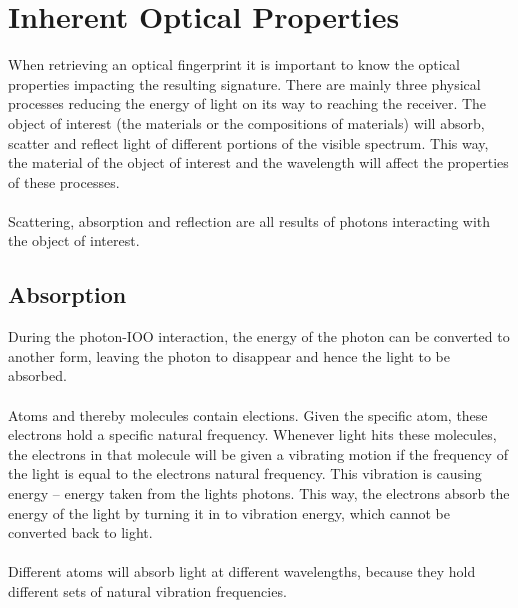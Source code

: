 \section{Inherent Optical Properties}
When retrieving an optical fingerprint it is important to know the optical properties impacting the resulting signature. There are mainly three physical processes reducing the energy of light on its way to reaching the receiver. The object of interest (the materials or the compositions of materials) will absorb, scatter and reflect light of different portions of the visible spectrum. This way, the material of the object of interest and the wavelength will affect the properties of these processes. 
\\\\
Scattering, absorption and reflection are all results of photons interacting with the object of interest. 
\subsection{Absorption}
During the photon-IOO interaction, the energy of the photon can be converted to another form, leaving the photon to disappear and hence the light to be absorbed. 
\\\\
Atoms and thereby molecules contain elections. Given the specific atom, these electrons hold a specific natural frequency. Whenever light hits these molecules, the electrons in that molecule will be given a vibrating motion if the frequency of the light is equal to the electrons natural frequency. This vibration is causing energy – energy taken from the lights photons. This way, the electrons absorb the energy of the light by turning it in to vibration energy, which cannot be converted back to light. 
\\\\
Different atoms will absorb light at different wavelengths, because they hold different sets of natural vibration frequencies. 


